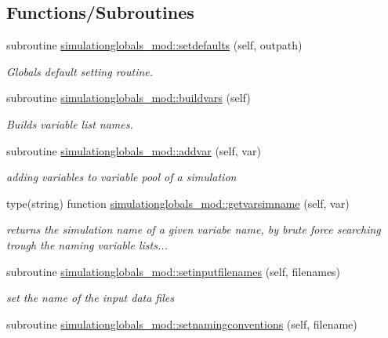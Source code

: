 \subsection*{Functions/\+Subroutines}
\begin{DoxyCompactItemize}
\item 
subroutine \mbox{\hyperlink{namespacesimulationglobals__mod_aa01e0a958ef2e94a02991dcfe390bfa0}{simulationglobals\+\_\+mod\+::setdefaults}} (self, outpath)
\begin{DoxyCompactList}\small\item\em Globals default setting routine. \end{DoxyCompactList}\item 
subroutine \mbox{\hyperlink{namespacesimulationglobals__mod_a4aa829af1699c705e46f47bb023ac162}{simulationglobals\+\_\+mod\+::buildvars}} (self)
\begin{DoxyCompactList}\small\item\em Builds variable list names. \end{DoxyCompactList}\item 
subroutine \mbox{\hyperlink{namespacesimulationglobals__mod_afd372c5764a180f9029d4dc3cddce94d}{simulationglobals\+\_\+mod\+::addvar}} (self, var)
\begin{DoxyCompactList}\small\item\em adding variables to variable pool of a simulation \end{DoxyCompactList}\item 
type(string) function \mbox{\hyperlink{namespacesimulationglobals__mod_ac83c53dd4e998e653981c7b1fa5dacbd}{simulationglobals\+\_\+mod\+::getvarsimname}} (self, var)
\begin{DoxyCompactList}\small\item\em returns the simulation name of a given variabe name, by brute force searching trough the naming variable lists... \end{DoxyCompactList}\item 
subroutine \mbox{\hyperlink{namespacesimulationglobals__mod_a422e3d203aad010489f541f645f63517}{simulationglobals\+\_\+mod\+::setinputfilenames}} (self, filenames)
\begin{DoxyCompactList}\small\item\em set the name of the input data files \end{DoxyCompactList}\item 
subroutine \mbox{\hyperlink{namespacesimulationglobals__mod_affd52c4c7b1c3f7ce282eeb7e4b4a359}{simulationglobals\+\_\+mod\+::setnamingconventions}} (self, filename)

\end{DoxyCompactItemize}
